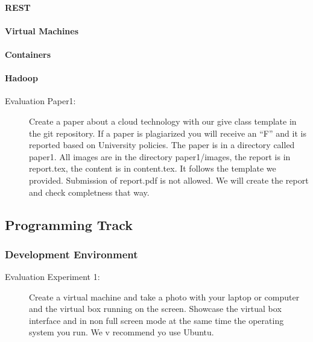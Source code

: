 
\paragraph{REST}

\paragraph{Virtual Machines}

\paragraph{Containers}

\paragraph{Hadoop}


\begin{description}
\item[Evaluation Paper1:] Create a paper about a cloud technology with
  our give class template in the git repository. If a paper is
  plagiarized you will receive an ``F'' and it is reported based on
  University policies. The paper is in a directory called paper1. All
  images are in the directory paper1/images, the report is in
  report.tex, the content is in content.tex. It follows the template
  we provided. Submission of report.pdf is not allowed. We will create
  the report and check completness that way.
\end{description}

\subsection{Programming Track}

\subsubsection{Development Environment}



\begin{description}
\item[Evaluation Experiment 1:] Create a virtual machine and take a
  photo with your laptop or computer and the virtual box running on
  the screen. Showcase the virtual box interface and in non full
  screen mode at the same time the operating system you run. We
v  recommend yo use Ubuntu.
\end{description}

